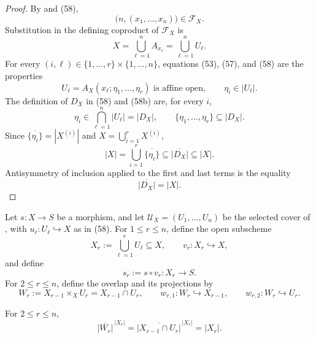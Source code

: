\begin{proof}
  By  and (58),
  \[
    \bigl(n,(x_1,\ldots,x_n)\bigr)\in\mathscr F_X.
  \]
  Substitution in the defining coproduct of $\mathscr F_X$ is
  \[
    X=\bigcup_{\ell=1}^nA_{x_\ell}
      =\bigcup_{\ell=1}^nU_\ell.                                 \tag{58a}
  \]
  For every $(i,\ell)\in\{1,\ldots,r\}\times\{1,\ldots,n\}$,
  equations (53), (57), and (58) are the properties
  \[
    U_\ell=A_X(x_\ell;\eta_1,\ldots,\eta_r)
      \text{ is affine open},
    \qquad
    \eta_i\in|U_\ell|.                                          \tag{58b}
  \]
  The definition of $D_X$ in (58) and (58b) are, for every $i$,
  \[
    \eta_i\in\bigcap_{\ell=1}^n|U_\ell|=|D_X|,
    \qquad
    \{\eta_1,\ldots,\eta_r\}\subseteq|D_X|.                    \tag{58c}
  \]
  Since $\overline{\{\eta_i\}}=|X^{(i)}|$ and
  $X=\bigcup_{i=1}^rX^{(i)}$,
  \[
    |X|
      =\bigcup_{i=1}^r\overline{\{\eta_i\}}
      \subseteq\overline{|D_X|}
      \subseteq|X|.
  \]
  Antisymmetry of inclusion applied to the first and last terms is the
  equality
  \[
    \overline{|D_X|}=|X|.
  \]
\end{proof}

\begin{definition}
  \label{def:nagata-partial-affine-unions}

  Let $s\colon X\to S$ be a morphism, and let
  $\mathcal U_X=(U_1,\ldots,U_n)$ be the selected cover of
  , with
  $u_\ell\colon U_\ell\hookrightarrow X$ as in (58).  For
  $1\leq r\leq n$, define the open subscheme
  \[
    X_r:=\bigcup_{\ell=1}^rU_\ell\subseteq X,
    \qquad v_r\colon X_r\hookrightarrow X,
  \]
  and define
  \[
    s_r:=s\circ v_r\colon X_r\to S.
  \]
  For $2\leq r\leq n$, define the overlap and its projections by
  \[
    W_r:=X_{r-1}\times_XU_r=X_{r-1}\cap U_r,
    \qquad
    w_{r,1}\colon W_r\hookrightarrow X_{r-1},
    \qquad
    w_{r,2}\colon W_r\hookrightarrow U_r.
  \]
\end{definition}

\begin{lemma}
  \label{lemma:nagata-partial-union-overlap-dense}

  For $2\leq r\leq n$,
  \[
    \overline{|W_r|}^{\,|X_r|}
      =\overline{|X_{r-1}\cap U_r|}^{\,|X_r|}=|X_r|.
  \]
\end{lemma}

